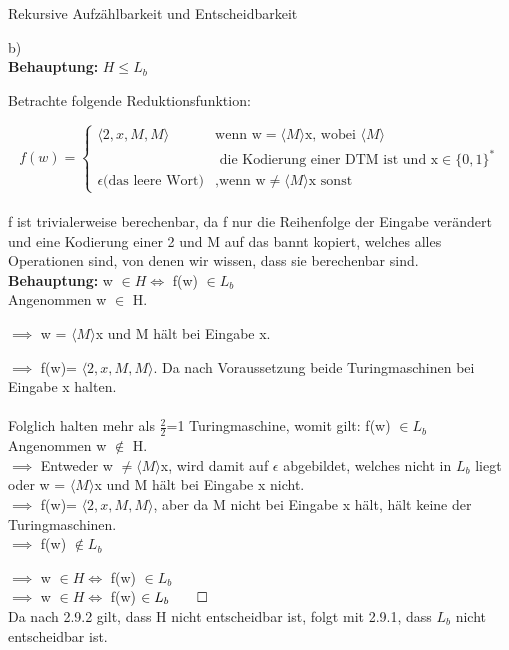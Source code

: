 \documentclass[answers]{submit}
\begin{document}
\begin{exercise}[6]{Rekursive Aufzählbarkeit und Entscheidbarkeit}
{    b) \\
    \textbf{Behauptung:} $H \leq L_b $

    Betrachte folgende Reduktionsfunktion:

    $$f(w)=\begin{cases}
        \langle 2,x,M,M\rangle           & \text{wenn w} = \langle M \rangle \text{x, wobei }  \langle M \rangle \\
                                         & \text{ die Kodierung einer DTM ist und x} \in \{0,1\}^*               \\
        \epsilon \text{(das leere Wort)} & \text{,wenn w} \neq \langle M \rangle \text{x sonst}
      \end{cases}$$ \\

    f ist trivialerweise berechenbar, da f nur die Reihenfolge der Eingabe verändert
    und eine Kodierung einer 2 und M auf das bannt kopiert, welches alles Operationen sind, von denen wir wissen,
    dass sie berechenbar sind. \\

    \textbf{Behauptung:} w $ \in H \iff$  f(w) $ \in L_b$ \\

    Angenommen w $\in$ H.

    $\implies$ w = $\langle M \rangle$x und M hält bei Eingabe x.

    $\implies$ f(w)= $\langle 2,x,M,M\rangle$. Da nach Voraussetzung beide Turingmaschinen bei Eingabe x halten.\\
    \\
    Folglich halten mehr als $\frac{2}{2}$=1 Turingmaschine, womit gilt: f(w) $\in L_b$ \\

    Angenommen w $\notin$ H. \\

    $\implies$ Entweder w $ \neq \langle M \rangle$x, wird damit auf $\epsilon$ abgebildet, welches nicht in $L_b$ liegt \\

    oder  w = $\langle M \rangle$x und M hält bei Eingabe x nicht.\\

    $\implies$ f(w)= $\langle 2,x,M,M\rangle$, aber da M nicht bei Eingabe x hält, hält keine der Turingmaschinen. \\

    $\implies$ f(w) $\notin L_b$

    $\implies $ w $ \in H \iff$  f(w) $ \in L_b$ \\

    $\implies$ w $ \in H \iff$  f(w) $ \in L_b \qed $ \\

    Da nach 2.9.2 gilt, dass H nicht entscheidbar ist, folgt mit 2.9.1, dass $L_b$ nicht entscheidbar ist.

  }

\end{exercise}
\end{document}

